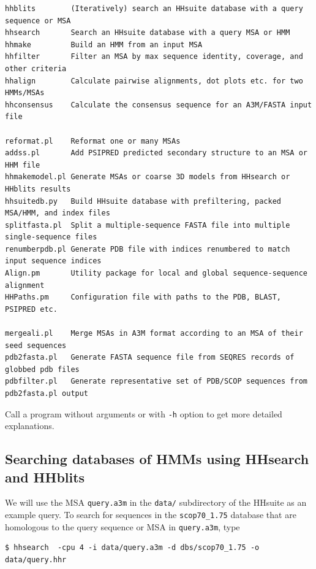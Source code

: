 \documentclass[11pt,a4paper]{article}
\begin{document}
\small 
\begin{verbatim}
hhblits        (Iteratively) search an HHsuite database with a query sequence or MSA
hhsearch       Search an HHsuite database with a query MSA or HMM
hhmake         Build an HMM from an input MSA 
hhfilter       Filter an MSA by max sequence identity, coverage, and other criteria
hhalign        Calculate pairwise alignments, dot plots etc. for two HMMs/MSAs
hhconsensus    Calculate the consensus sequence for an A3M/FASTA input file

reformat.pl    Reformat one or many MSAs
addss.pl       Add PSIPRED predicted secondary structure to an MSA or HHM file
hhmakemodel.pl Generate MSAs or coarse 3D models from HHsearch or HHblits results	
hhsuitedb.py   Build HHsuite database with prefiltering, packed MSA/HMM, and index files
splitfasta.pl  Split a multiple-sequence FASTA file into multiple single-sequence files
renumberpdb.pl Generate PDB file with indices renumbered to match input sequence indices
Align.pm       Utility package for local and global sequence-sequence alignment
HHPaths.pm     Configuration file with paths to the PDB, BLAST, PSIPRED etc.

mergeali.pl    Merge MSAs in A3M format according to an MSA of their seed sequences
pdb2fasta.pl   Generate FASTA sequence file from SEQRES records of globbed pdb files
pdbfilter.pl   Generate representative set of PDB/SCOP sequences from pdb2fasta.pl output
\end{verbatim} 
\normalsize


Call a program without arguments or with \verb`-h` option to get more detailed explanations.


\subsection{Searching databases of HMMs using HHsearch and HHblits}\label{searching_hm_dbs}

We will use the MSA \verb`query.a3m` in the \verb`data/` subdirectory of the HHsuite as an example query. To search for sequences in the \verb`scop70_1.75` database that are homologous to the query sequence or MSA in \verb`query.a3m`, type

\begin{verbatim}
$ hhsearch  -cpu 4 -i data/query.a3m -d dbs/scop70_1.75 -o data/query.hhr
\end{verbatim}
\end{document}
